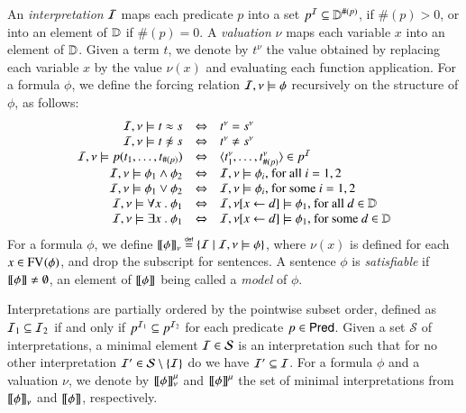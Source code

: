 \documentclass{llncs}
\begin{document}

An \emph{interpretation} $\mathcal{I}$ maps each predicate $p$ into a set $p^{\mathcal{I}}
\subseteq \mathbb{D}^{\#(p)}$, if $\#(p)>0$, or into an element of $\mathbb{D}$
if $\#(p)=0$. A \emph{valuation} $\nu$ maps each variable $x$ into an
element of $\mathbb{D}$. Given a term $t$, we denote by $t^\nu$ the value
obtained by replacing each variable $x$ by the value $\nu(x)$ and
evaluating each function application. For a formula $\phi$, we define
the forcing relation $\mathcal{I},\nu \models \phi$ recursively on the
structure of $\phi$, as follows:
\[
\begin{array}{rcl}
\I,\nu \models t \teq s & \iff & t^\nu=s^\nu \\
\I,\nu \models t \not\teq s & \iff & t^\nu \neq s^\nu \\
\I,\nu \models p(t_1,\ldots,t_{\#(p)}) & \iff & \tuple{t_1^\nu,\ldots,t_{\#(p)}^\nu} \in p^\I \\
\I,\nu \models \phi_1 \wedge \phi_2 & \iff & \I,\nu \models \phi_i \text{, for all } i=1,2 \\ 
\I,\nu \models \phi_1 \vee \phi_2 & \iff & \I,\nu \models \phi_i \text{, for some } i=1,2 \\
\I,\nu \models \forall x ~.~ \phi_1 & \iff & \I,\nu[x\leftarrow d] \models \phi_1 \text{, for all } d \in \Data \\
\I,\nu \models \exists x ~.~ \phi_1 & \iff & \I,\nu[x\leftarrow d] \models \phi_1 \text{, for some } d \in \Data 
\end{array}
\]
For a formula $\phi$, we define ${\bf [\![} \phi {\bf ]\!]}_\nu \stackrel{\scriptscriptstyle{\mathsf{def}}}{=} \{ \mathcal{I} \mid
  \mathcal{I},\nu \models \phi \}$, where $\nu(x)$ is defined for each $x \in
\mathrm{FV}_{}(\phi)$, and drop the subscript for sentences. A sentence $\phi$
is \emph{satisfiable} if ${\bf [\![} \phi {\bf ]\!]}\neq\emptyset$, an element of
${\bf [\![} \phi {\bf ]\!]}$ being called a \emph{model} of $\phi$.

Interpretations are partially ordered by the pointwise subset order,
defined as $\mathcal{I}_1 \subseteq \mathcal{I}_2$ if and only if $p^{\mathcal{I}_1} \subseteq
p^{\mathcal{I}_2}$ for each predicate $p \in \mathsf{Pred}$. Given a set $\mathcal{S}$
of interpretations, a minimal element $\mathcal{I} \in \mathcal{S}$ is an
interpretation such that for no other interpretation $\mathcal{I}' \in
\mathcal{S} \setminus \{ \mathcal{I} \}$ do we have $\mathcal{I}' \subseteq \mathcal{I}$. For a
formula $\phi$ and a valuation $\nu$, we denote by ${\bf [\![} \phi {\bf ]\!]}^\mu_\nu$
and ${\bf [\![} \phi {\bf ]\!]}^\mu$ the set of minimal interpretations from
${\bf [\![} \phi {\bf ]\!]}_\nu$ and ${\bf [\![} \phi {\bf ]\!]}$, respectively.
\end{document}
